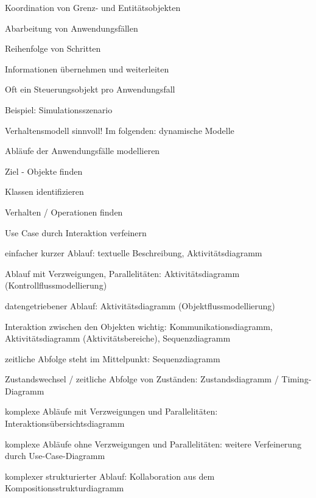 \documentclass[a4paper]{article}
\begin{document}
\begin{multicols}{3}
\begin{itemize*}
          \begin{itemize*}
            \item Koordination von Grenz- und Entitätsobjekten
            \item Abarbeitung von Anwendungsfällen
                  \begin{itemize*}
                    \item Reihenfolge von Schritten
                    \item Informationen übernehmen und weiterleiten
                    \item Oft ein Steuerungsobjekt pro Anwendungsfall
                  \end{itemize*}
            \item Beispiel: Simulationsszenario
            \item Verhaltensmodell sinnvoll! Im folgenden: dynamische Modelle
          \end{itemize*}
  \end{itemize*}

  \begin{itemize*}
    \item Abläufe der Anwendungsfälle modellieren
          \begin{itemize*}
            \item Ziel - Objekte finden
            \item Klassen identifizieren
            \item Verhalten / Operationen finden
          \end{itemize*}
    \item Use Case durch Interaktion verfeinern
          \begin{itemize*}
            \item einfacher kurzer Ablauf: textuelle Beschreibung, Aktivitätsdiagramm
            \item Ablauf mit Verzweigungen, Parallelitäten: Aktivitätsdiagramm (Kontrollflussmodellierung)
            \item datengetriebener Ablauf: Aktivitätsdiagramm (Objektflussmodellierung)
            \item Interaktion zwischen den Objekten wichtig: Kommunikationsdiagramm, Aktivitätsdiagramm (Aktivitätsbereiche), Sequenzdiagramm
            \item zeitliche Abfolge steht im Mittelpunkt: Sequenzdiagramm
            \item Zustandswechsel / zeitliche Abfolge von Zuständen: Zustandsdiagramm / Timing-Diagramm
            \item komplexe Abläufe mit Verzweigungen und Parallelitäten: Interaktionsübersichtsdiagramm
            \item komplexe Abläufe ohne Verzweigungen und Parallelitäten: weitere Verfeinerung durch Use-Case-Diagramm
            \item komplexer strukturierter Ablauf: Kollaboration aus dem Kompositionsstrukturdiagramm
          \end{itemize*}
  \end{itemize*}


\end{multicols}
\end{document}
